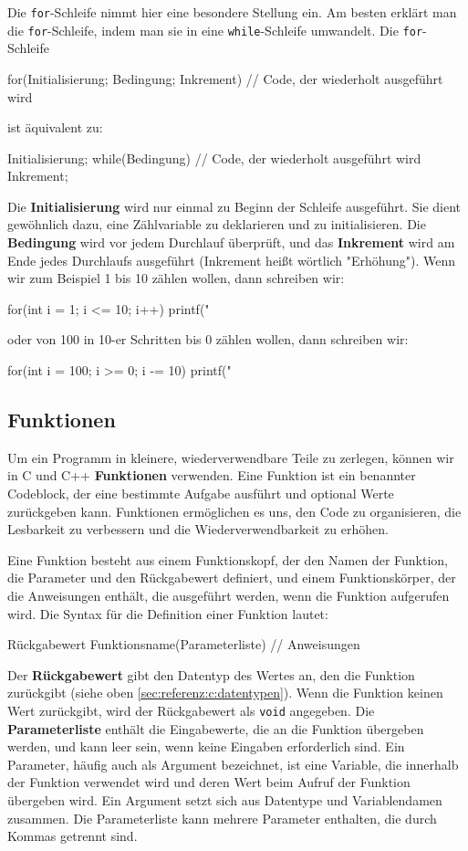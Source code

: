 Die \texttt{for}-Schleife nimmt hier eine besondere Stellung ein. Am besten erklärt man die \texttt{for}-Schleife, indem man sie in eine \texttt{while}-Schleife umwandelt. Die \texttt{for}-Schleife
\begin{code}
for(Initialisierung; Bedingung; Inkrement) {
    // Code, der wiederholt ausgeführt wird
}
\end{code}
ist äquivalent zu:
\begin{code}
{
    Initialisierung;
    while(Bedingung) {
        // Code, der wiederholt ausgeführt wird
        Inkrement;
    }
}
\end{code}
Die \textbf{Initialisierung} wird nur einmal zu Beginn der Schleife ausgeführt. Sie dient gewöhnlich dazu, eine Zählvariable zu deklarieren und zu initialisieren. Die \textbf{Bedingung} wird vor jedem Durchlauf überprüft, und das \textbf{Inkrement} wird am Ende jedes Durchlaufs ausgeführt (Inkrement heißt wörtlich "Erhöhung"). Wenn wir zum Beispiel 1 bis 10 zählen wollen, dann schreiben wir:
\begin{code}
for(int i = 1; i <= 10; i++) {
    printf("%
}
\end{code}
oder von 100 in 10-er Schritten bis 0 zählen wollen, dann schreiben wir:
\begin{code}
for(int i = 100; i >= 0; i -= 10) {
    printf("%
}       
\end{code}

\subsection{Funktionen}

Um ein Programm in kleinere, wiederverwendbare Teile zu zerlegen, können wir in C und C++ \textbf{Funktionen} verwenden. Eine Funktion ist ein benannter Codeblock, der eine bestimmte Aufgabe ausführt und optional Werte zurückgeben kann. Funktionen ermöglichen es uns, den Code zu organisieren, die Lesbarkeit zu verbessern und die Wiederverwendbarkeit zu erhöhen.

Eine Funktion besteht aus einem Funktionskopf, der den Namen der Funktion, die Parameter und den Rückgabewert definiert, und einem Funktionskörper, der die Anweisungen enthält, die ausgeführt werden, wenn die Funktion aufgerufen wird. Die Syntax für die Definition einer Funktion lautet:
\begin{code}
Rückgabewert Funktionsname(Parameterliste) {
    // Anweisungen
}
\end{code}
Der \textbf{Rückgabewert} gibt den Datentyp des Wertes an, den die Funktion zurückgibt (siehe oben \ref{sec:referenz:c:datentypen}). Wenn die Funktion keinen Wert zurückgibt, wird der Rückgabewert als \texttt{void} angegeben. Die \textbf{Parameterliste} enthält die Eingabewerte, die an die Funktion übergeben werden, und kann leer sein, wenn keine Eingaben erforderlich sind. Ein Parameter, häufig auch als Argument bezeichnet, ist eine Variable, die innerhalb der Funktion verwendet wird und deren Wert beim Aufruf der Funktion übergeben wird. Ein Argument setzt sich aus Datentype und Variablendamen zusammen. Die Parameterliste kann mehrere Parameter enthalten, die durch Kommas getrennt sind.

